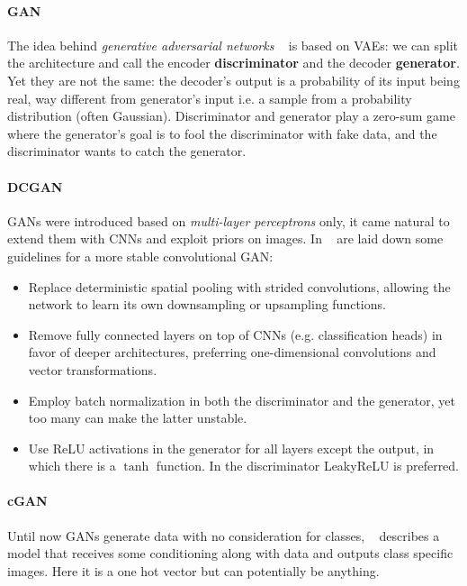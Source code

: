 \documentclass[10pt,twocolumn,letterpaper]{article}
\begin{document}
\paragraph{GAN} The idea behind \textit{generative adversarial networks} ~\cite{goodfellow2014generative} is based on VAEs: we can split the architecture and call the encoder \textbf{discriminator} and the decoder \textbf{generator}.
Yet they are not the same: the decoder's output is a probability of its input being real, way different from generator's input i.e. a sample from a probability distribution (often Gaussian).
Discriminator and generator play a zero-sum game where the generator's goal is to fool the discriminator with fake data, and the discriminator wants to catch the generator.

\paragraph{DCGAN} GANs were introduced based on \textit{multi-layer perceptrons} only, it came natural to extend them with CNNs and exploit priors on images.
In ~\cite{radford2015unsupervised} are laid down some guidelines for a more stable convolutional GAN:
\begin{itemize}
   \item Replace deterministic spatial pooling with strided convolutions, allowing the network to learn its own downsampling or upsampling functions.
   \item Remove fully connected layers on top of CNNs (e.g. classification heads) in favor of deeper architectures, preferring one-dimensional convolutions and vector transformations.
   \item Employ batch normalization in both the discriminator and the generator, yet too many can make the latter unstable.
   \item Use ReLU activations in the generator for all layers except the output, in which there is a $\tanh$ function.
         In the discriminator LeakyReLU is preferred.
\end{itemize}

\paragraph{cGAN} Until now GANs generate data with no consideration for classes, ~\cite{mirza2014conditional} describes a model that receives some conditioning along with data and outputs class specific images.
Here it is a one hot vector but can potentially be anything.
\end{document}
